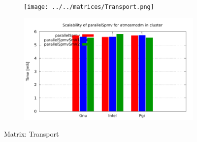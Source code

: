 \begin{figure} [ht!]
    \centering
    \captionsetup{justification=centering, singlelinecheck=false}
    \begin{subfigure}{.65\textwidth}
      \centering
      \hspace*{-3.5cm} 
      \texttt{[image: ../../matrices/Transport.png]}
      \label{fig:Transport_matrix}
    \end{subfigure}%
    \begin{subfigure}{.65\textwidth}
      \centering
      \hspace*{-6.0cm} 
      \includegraphics[page=9, width=0.95\linewidth]{../plots/myCluster_4-2.pdf}
      \label{fig:Transport_performance}
    \end{subfigure}
\caption{Matrix: Transport}
\label{fig:Transport}
\end{figure}


\medskip
